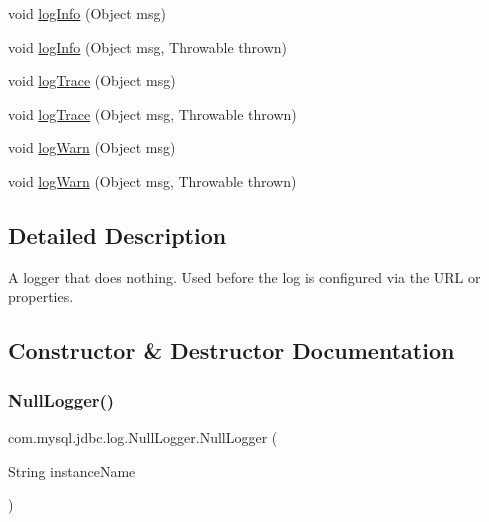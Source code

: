 \begin{DoxyCompactItemize}
\item 
void \mbox{\hyperlink{classcom_1_1mysql_1_1jdbc_1_1log_1_1_null_logger_afa227f49b4d9992c7e4393e278dc1a77}{log\+Info}} (Object msg)
\item 
void \mbox{\hyperlink{classcom_1_1mysql_1_1jdbc_1_1log_1_1_null_logger_a1b2aee92fb46eff36af64ff88e877f17}{log\+Info}} (Object msg, Throwable thrown)
\item 
void \mbox{\hyperlink{classcom_1_1mysql_1_1jdbc_1_1log_1_1_null_logger_ad02d3a7495ef1e52a7d558fdabb5d76b}{log\+Trace}} (Object msg)
\item 
void \mbox{\hyperlink{classcom_1_1mysql_1_1jdbc_1_1log_1_1_null_logger_a5c6f91128dff5836650a7dbfea43ddf2}{log\+Trace}} (Object msg, Throwable thrown)
\item 
void \mbox{\hyperlink{classcom_1_1mysql_1_1jdbc_1_1log_1_1_null_logger_a044427d312493d8d18be0033d2451d36}{log\+Warn}} (Object msg)
\item 
void \mbox{\hyperlink{classcom_1_1mysql_1_1jdbc_1_1log_1_1_null_logger_aa77c3a63e80bc15adc4c26d886e3d5f5}{log\+Warn}} (Object msg, Throwable thrown)
\end{DoxyCompactItemize}


\subsection{Detailed Description}
A logger that does nothing. Used before the log is configured via the U\+RL or properties. 

\subsection{Constructor \& Destructor Documentation}
\mbox{\label{classcom_1_1mysql_1_1jdbc_1_1log_1_1_null_logger_a16de8639c3f8b5c7109af5d00660b5c3}} 
\subsubsection{\texorpdfstring{Null\+Logger()}{NullLogger()}}
{\footnotesize\ttfamily com.\+mysql.\+jdbc.\+log.\+Null\+Logger.\+Null\+Logger (\begin{DoxyParamCaption}\item[{String}]{instance\+Name }\end{DoxyParamCaption})}

